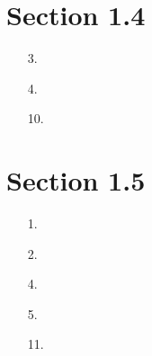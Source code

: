 \documentclass{article}
\begin{document}
\section*{Section 1.4}
\begin{itemize}
    \item [3.]
    \item [4.]
    \item [10.]
\end{itemize}

\section*{Section 1.5}
\begin{itemize}
    \item [1.]
    \item [2.]
    \item [4.]
    \item [5.]
    \item [11.]
\end{itemize}
\end{document}
